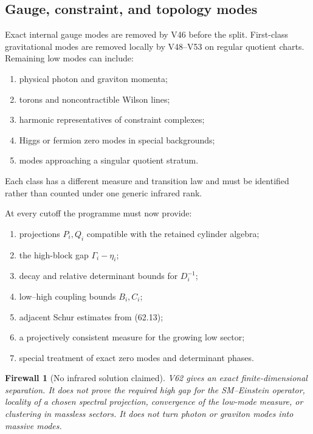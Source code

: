 \documentclass[11pt]{article}
\newtheorem{firewall}[theorem]{Firewall}
\begin{document}
\subsection{Gauge, constraint, and topology modes}

Exact internal gauge modes are removed by V46 before the split.
First-class gravitational modes are removed locally by V48--V53 on
regular quotient charts.  Remaining low modes can include:
\begin{enumerate}
\item physical photon and graviton momenta;
\item torons and noncontractible Wilson lines;
\item harmonic representatives of constraint complexes;
\item Higgs or fermion zero modes in special backgrounds;
\item modes approaching a singular quotient stratum.
\end{enumerate}
Each class has a different measure and transition law and must be
identified rather than counted under one generic infrared rank.

\begin{ledger}
\label{led:v11v62-data}
At every cutoff the programme must now provide:
\begin{enumerate}
\item projections \(P_i,Q_i\) compatible with the retained cylinder
algebra;
\item the high-block gap \(\Gamma_i-\eta_i\);
\item decay and relative determinant bounds for \(D_i^{-1}\);
\item low--high coupling bounds \(B_i,C_i\);
\item adjacent Schur estimates from (62.13);
\item a projectively consistent measure for the growing low sector;
\item special treatment of exact zero modes and determinant phases.
\end{enumerate}
\end{ledger}

\begin{firewall}[No infrared solution claimed]
\label{fire:v11v62-boundary}
V62 gives an exact finite-dimensional separation.  It does not prove
the required high gap for the SM--Einstein operator, locality of a
chosen spectral projection, convergence of the low-mode measure, or
clustering in massless sectors.  It does not turn photon or graviton
modes into massive modes.
\end{firewall}
\end{document}
